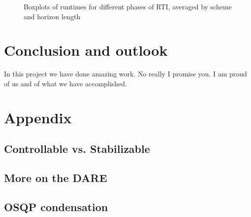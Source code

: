 \documentclass[12pt]{article}
\begin{document}
\begin{itemize}[label=\textbullet]
\begin{figure}[!h]
		\caption{Boxplots of runtimes for different phases of RTI, averaged by scheme and horizon length}
		\label{fig:runtimes}
	\end{figure}

\end{itemize}

\section{Conclusion and outlook}

In this project we have done amazing work. No really I promise you.
I am proud of us and of what we have accomplished.


\newpage

\section{Appendix}
\printbibliography

\newpage

\subsection*{Controllable vs. Stabilizable}\label{sec:controllability-stabilizability}

\subsection*{More on the DARE}\label{sec:DARE}

\subsection*{OSQP condensation}\label{sec:osqp-condensation}
\end{document}
